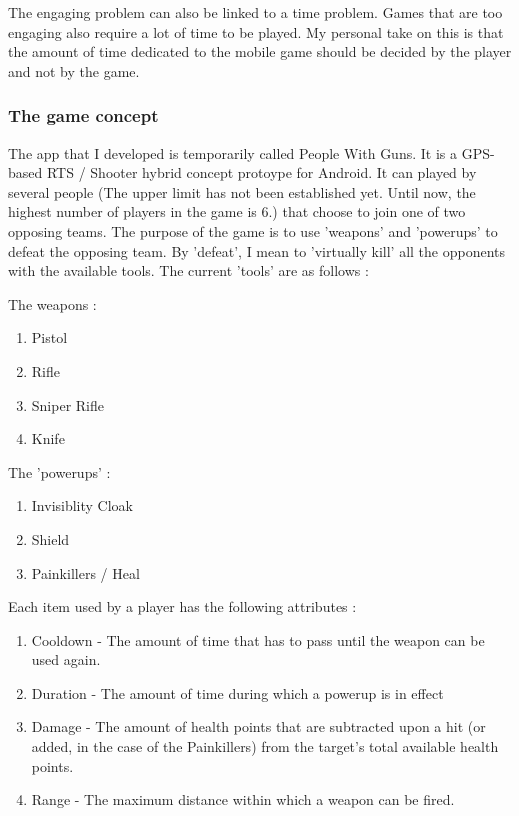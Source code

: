\documentclass{article}
\begin{document}
The engaging problem can also be linked to a time problem. Games that are too
engaging also require a lot of time to be played. My personal take on this is
that the amount of time dedicated to the mobile game should be decided by the
player and not by the game. \newline

\subsubsection{The game concept}
The app that I developed is temporarily called People With Guns. It is a GPS-
based RTS / Shooter hybrid concept protoype for Android. It can played by
several people (The upper limit has not been established yet. Until now, the
highest number of players in the game is 6.) that choose to join one of two
opposing teams. The purpose of the game is to use 'weapons' and 'powerups' to
defeat the opposing team. By 'defeat', I mean to 'virtually kill' all the
opponents with the available tools. The current 'tools' are as follows :\newline 

The weapons : 
\begin{enumerate}
  \item Pistol
  \item Rifle
  \item Sniper Rifle
  \item Knife   
\end{enumerate}

The 'powerups' :
\begin{enumerate}
  \item Invisiblity Cloak
  \item Shield
  \item Painkillers / Heal
\end{enumerate}

Each item used by a player has the following attributes : 
\begin{enumerate}
  \item Cooldown - The amount of time that has to pass until the weapon can be
  used again.
  \item Duration - The amount of time during which a powerup is in effect 
  \item Damage - The amount of health points that are subtracted upon a hit (or
  added, in the case of the Painkillers) from the target's total available
  health points.
  \item Range - The maximum distance within which a weapon can be fired.
\end{enumerate}
\end{document}
